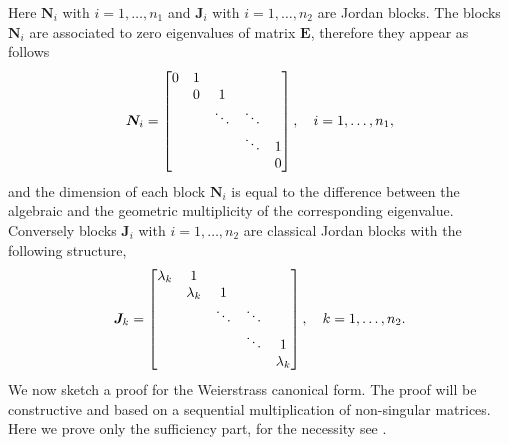 		Here $\bm{N}_{i}$ with $i=1,\dots,n_{1}$ and $\bm{J}_{i}$ with $i=1,\dots,n_{2}$ are Jordan blocks. The blocks $\bm{N}_{i}$ are associated to zero eigenvalues of matrix $\bm{E}$, therefore they appear as follows 
		\begin{equation}
			\bm{N}_{i} = 
			\begin{bmatrix}
				0 	& 1 	& 			&			&  	\\
				  	& 0 	& 1 		&			& 	\\
					&   	& \ddots 	&	\ddots	&  \\
					&   	& 			& 	\ddots	& 1 \\
					&		&			&			& 0
			\end{bmatrix}, \quad i =1,\dots,n_{1}	\\,
		\end{equation}
		and the dimension of each block $\bm{N}_{i}$ is equal to the difference between the algebraic and the geometric multiplicity of the corresponding eigenvalue. Conversely blocks $\bm{J}_{i}$ with $i=1,\dots,n_{2}$ are classical Jordan blocks with the following structure, 
		\begin{equation}	
			\bm{J}_{k} = 
				\begin{bmatrix}
					\lambda_{k} 	& 1 	& 			&			&  	\\
						& \lambda_{k} 	& 1 		&			& 	\\
						&   	& \ddots 	&	\ddots	&  \\
						&   	& 			& 	\ddots	& 1 \\
						&		&			&			& \lambda_{k}
				\end{bmatrix}, \quad k =1,\dots,n_{2}	\\.
		\end{equation}
		We now sketch a proof for the Weierstrass canonical form. The proof will be constructive and based on a sequential multiplication of non-singular matrices. Here we prove only the sufficiency part, for the necessity see \cite{gantmacher1964theory}.
